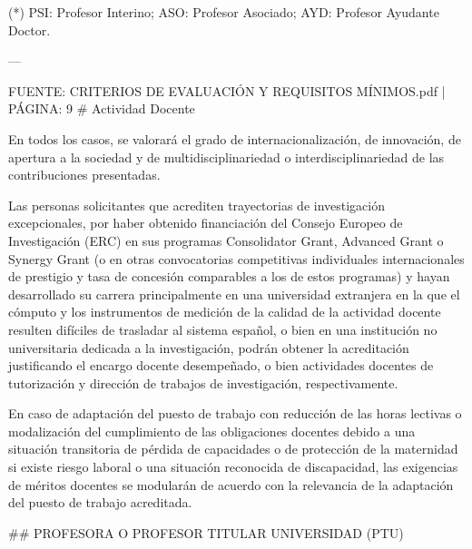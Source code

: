 \documentclass{article}
\begin{document}
\begin{itemize}
\begin{itemize}
\begin{scriptsize}
                  (*) PSI: Profesor Interino; ASO: Profesor Asociado; AYD: Profesor Ayudante Doctor.

                  ---

                  FUENTE: CRITERIOS DE EVALUACIÓN Y REQUISITOS MÍNIMOS.pdf | PÁGINA: 9
                  \# Actividad Docente

                  En todos los casos, se valorará el grado de internacionalización, de innovación, de apertura a la sociedad y de multidisciplinariedad o interdisciplinariedad de las contribuciones presentadas.

                  Las personas solicitantes que acrediten trayectorias de investigación excepcionales, por haber obtenido financiación del Consejo Europeo de Investigación (ERC) en sus programas Consolidator Grant, Advanced Grant o Synergy Grant (o en otras convocatorias competitivas individuales internacionales de prestigio y tasa de concesión comparables a los de estos programas) y hayan desarrollado su carrera principalmente en una universidad extranjera en la que el cómputo y los instrumentos de medición de la calidad de la actividad docente resulten difíciles de trasladar al sistema español, o bien en una institución no universitaria dedicada a la investigación, podrán obtener la acreditación justificando el encargo docente desempeñado, o bien actividades docentes de tutorización y dirección de trabajos de investigación, respectivamente.

                  En caso de adaptación del puesto de trabajo con reducción de las horas lectivas o modalización del cumplimiento de las obligaciones docentes debido a una situación transitoria de pérdida de capacidades o de protección de la maternidad si existe riesgo laboral o una situación reconocida de discapacidad, las exigencias de méritos docentes se modularán de acuerdo con la relevancia de la adaptación del puesto de trabajo acreditada.

                  \#\# PROFESORA O PROFESOR TITULAR UNIVERSIDAD (PTU)


\end{scriptsize}
\end{itemize}
\end{itemize}
\end{document}

